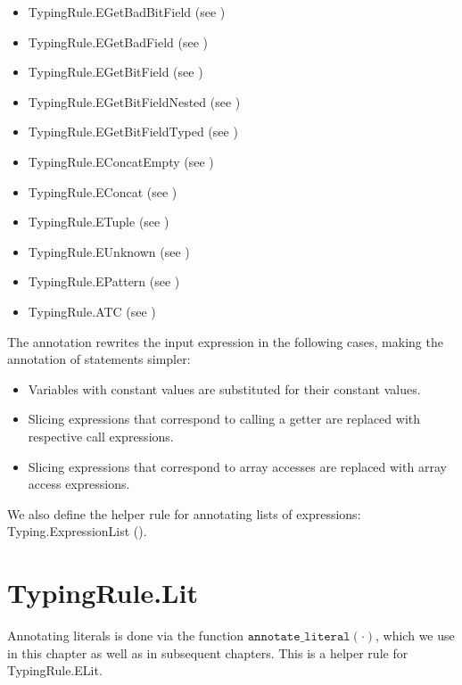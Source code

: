 \documentclass{book}
\newcommand\annotateliteral[1]{\texttt{annotate\_literal}(#1)}
\begin{document}
\begin{itemize}
\item TypingRule.EGetBadBitField (see )
\item TypingRule.EGetBadField (see )
\item TypingRule.EGetBitField (see )
\item TypingRule.EGetBitFieldNested (see )
\item TypingRule.EGetBitFieldTyped (see )
\item TypingRule.EConcatEmpty (see )
\item TypingRule.EConcat (see )
\item TypingRule.ETuple (see )
\item TypingRule.EUnknown (see )
\item TypingRule.EPattern (see )
\item TypingRule.ATC (see )
\end{itemize}

The annotation rewrites the input expression in the following cases, making the annotation of statements simpler:
\begin{itemize}
  \item Variables with constant values are substituted for their constant values.
  \item Slicing expressions that correspond to calling a getter are replaced with respective call expressions.
  \item Slicing expressions that correspond to array accesses are replaced with array access expressions.
\end{itemize}

We also define the helper rule for annotating lists of expressions:
Typing.ExpressionList ().

\section{TypingRule.Lit \label{sec:TypingRule.Lit}}

Annotating literals is done via the function $\annotateliteral{\cdot}$,
which we use in this chapter as well as in subsequent chapters.
This is a helper rule for TypingRule.ELit.
\end{document}
